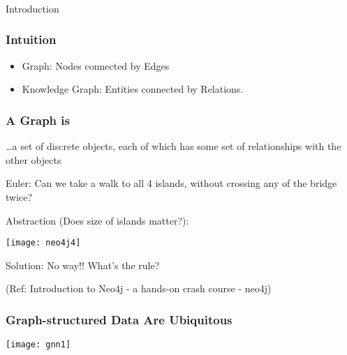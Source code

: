 \begin{frame}[fragile]\frametitle{}
\begin{center}
{\Large Introduction}
\end{center}
\end{frame}



\begin{frame}[fragile]\frametitle{Intuition}

\begin{itemize}
\item Graph: Nodes connected by Edges
\item Knowledge Graph: Entities connected by Relations.
\end{itemize}
	  
\end{frame}




\begin{frame}\frametitle{A Graph is}
{\emph \ldots a set of discrete objects, each of which has some set of relationships with the other objects}

Euler: Can we take a walk to all 4 islands, without crossing any of the bridge twice?

Abstraction (Does size of islands matter?):

\begin{center}
\texttt{[image: neo4j4]}
\end{center}	  

Solution: No way!! What's the rule?

{\tiny (Ref: Introduction to Neo4j - a hands-on crash course - neo4j)}
\end{frame}


\begin{frame}[fragile]\frametitle{ Graph-structured Data Are Ubiquitous }

\begin{center}
\texttt{[image: gnn1]}
\end{center}	  

\end{frame}




